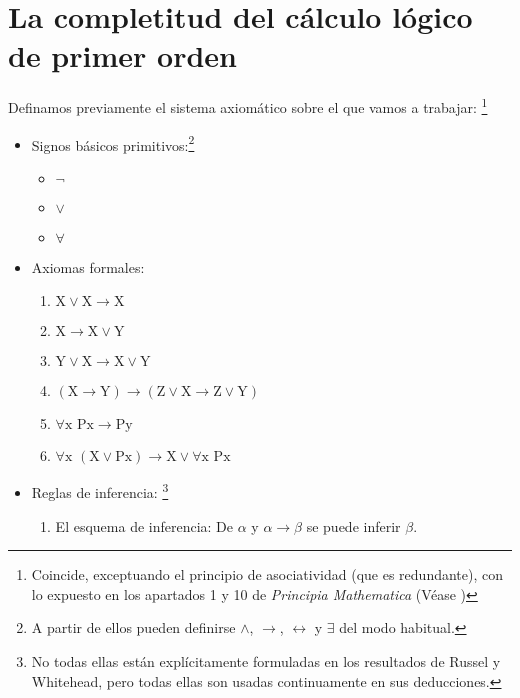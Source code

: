 
\chapter{La completitud del cálculo lógico de primer orden}

Definamos previamente el sistema axiomático sobre el que vamos a trabajar:
\footnote{Coincide, exceptuando el principio de asociatividad (que es redundante), con lo expuesto en los apartados 1 y 10 de 
\textit{Principia Mathematica} (Véase \cite{an1910principia})}
\begin{itemize}
    \item Signos básicos primitivos:\footnote{A partir de ellos pueden definirse $\wedge$, $\rightarrow$, $\leftrightarrow$ y 
            $\exists$ del modo habitual.}
            \begin{itemize}
                \item $\lnot$
                \item $\vee$
                \item $\forall$
            \end{itemize}
    \item Axiomas formales:
            \begin{enumerate}
                \item $ \text{X} \vee \text{X} \rightarrow \text{X} $
                \item $ \text{X} \rightarrow \text{X} \vee \text{Y} $
                \item $ \text{Y} \vee \text{X} \rightarrow \text{X} \vee \text{Y} $
                \item $ (\text{X} \rightarrow \text{Y}) \rightarrow (\text{Z} \vee \text{X} \rightarrow \text{Z} \vee \text{Y}) $
                \item $ \forall \text{x Px} \rightarrow \text{Py} $
                \item $ \forall \text{x } (\text{X} \vee \text{Px}) \rightarrow \text{X} \vee \forall \text{x Px} $
            \end{enumerate}
    \item Reglas de inferencia: \footnote{No todas ellas están explícitamente formuladas en los resultados de Russel y Whitehead,
            pero todas ellas son usadas continuamente en sus deducciones.}
            \begin{enumerate}
                \item El esquema de inferencia: De $\alpha$ y $\alpha \rightarrow \beta$ se puede inferir $\beta$.

\end{enumerate}
\end{itemize}
